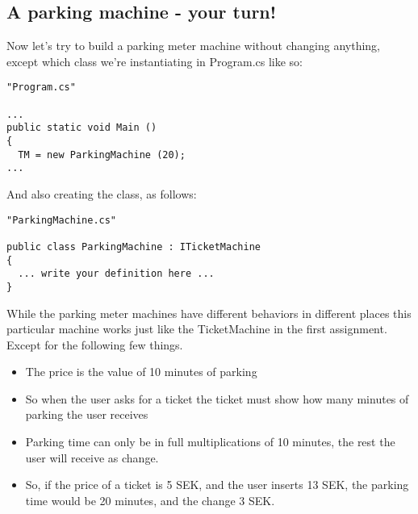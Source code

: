 \documentclass{article}
\begin{document}
\subsection{A parking machine - your turn!}
Now let’s try to build a parking meter machine without changing anything, except which class we’re instantiating in Program.cs like so:
\begin{lstlisting}
"Program.cs"

...
public static void Main ()
{ 
  TM = new ParkingMachine (20);
...
\end{lstlisting}
And also creating the class, as follows:
\begin{lstlisting}
"ParkingMachine.cs"

public class ParkingMachine : ITicketMachine
{
  ... write your definition here ...
}
\end{lstlisting}
While the parking meter machines have different behaviors in different places this particular machine works just like the TicketMachine in the first assignment. Except for the following few things.
\begin{itemize}
  \item The price is the value of 10 minutes of parking
  \item So when the user asks for a ticket the ticket must show how many minutes of parking the user receives
  \item Parking time can only be in full multiplications of 10 minutes, the rest the user will receive as change.
  \item So, if the price of a ticket is 5 SEK, and the user inserts 13 SEK, the parking time would be 20 minutes, and the change 3 SEK.
\end{itemize}
\end{document}
